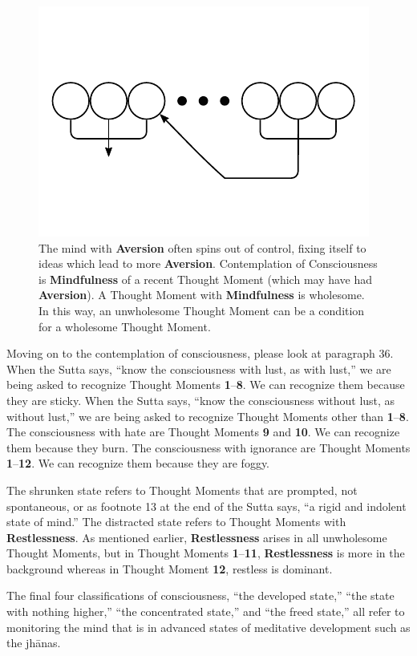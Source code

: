 \begin{figure}[h]
\centering
\includegraphics[width=0.7\linewidth]{./Diagrams/Aversion}
\caption{The mind with \textbf{Aversion} often spins out of control, fixing itself to ideas which lead to more \textbf{Aversion}. Contemplation of Consciousness is \textbf{Mindfulness} of a recent Thought Moment (which may have had \textbf{Aversion}). A Thought Moment with \textbf{Mindfulness} is wholesome. In this way, an unwholesome Thought Moment can be a condition for a wholesome Thought Moment.}
\label{fig:Aversion}
\end{figure}

Moving on to the contemplation of consciousness, please look at paragraph 36. When the Sutta says, “know the consciousness with lust, as with lust,” we are being asked to recognize Thought Moments \textbf{1}--\textbf{8}. We can recognize them because they are sticky. When the Sutta says, “know the consciousness without lust, as without lust,” we are being asked to recognize Thought Moments other than \textbf{1}--\textbf{8}. The consciousness with hate are Thought Moments \textbf{9} and \textbf{10}. We can recognize them because they burn. The consciousness with ignorance are Thought Moments \textbf{1}--\textbf{12}. We can recognize them because they are foggy.

The shrunken state refers to Thought Moments that are prompted, not spontaneous, or as footnote 13 at the end of the Sutta says, “a rigid and indolent state of mind.” The distracted state refers to Thought Moments with \textbf{Restlessness}. As mentioned earlier, \textbf{Restlessness} arises in all unwholesome Thought Moments, but in Thought Moments \textbf{1}--\textbf{11}, \textbf{Restlessness} is more in the background whereas in Thought Moment \textbf{12}, restless is dominant.

The final four classifications of consciousness, “the developed state,” “the state with nothing higher,” “the concentrated state,” and “the freed state,” all refer to monitoring the mind that is in advanced states of meditative development such as the jhānas.

